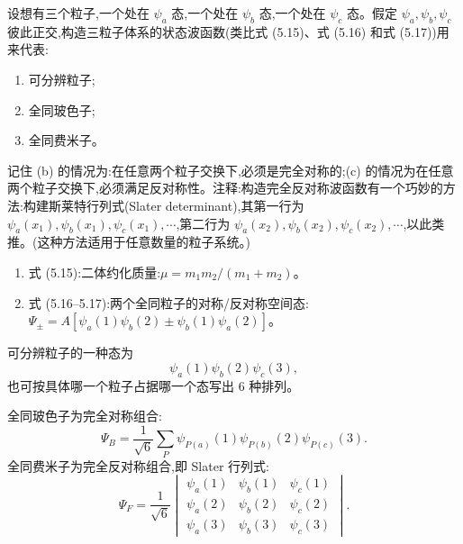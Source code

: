 \begin{question}
设想有三个粒子,一个处在 $\psi_a$ 态,一个处在 $\psi_b$ 态,一个处在 $\psi_c$ 态。假定 $\psi_a,\psi_b,\psi_c$ 彼此正交,构造三粒子体系的状态波函数(类比式 (5.15)、式 (5.16) 和式 (5.17))用来代表:
\begin{enumerate}
\item 可分辨粒子;
\item 全同玻色子;
\item 全同费米子。
\end{enumerate}
记住 (b) 的情况为:在任意两个粒子交换下,必须是完全对称的;(c) 的情况为在任意两个粒子交换下,必须满足反对称性。注释:构造完全反对称波函数有一个巧妙的方法:构建斯莱特行列式(Slater determinant),其第一行为 $\psi_a(x_1),\psi_b(x_1),\psi_c(x_1),\cdots$,第二行为 $\psi_a(x_2),\psi_b(x_2),\psi_c(x_2),\cdots$,以此类推。(这种方法适用于任意数量的粒子系统。)

\par\smallskip
{}
\begin{enumerate}[leftmargin=2.2em,itemsep=0.12em,topsep=0.12em,parsep=0pt]
\item 式 (5.15):二体约化质量:$\mu=m_1m_2/(m_1+m_2)$。
\item 式 (5.16--5.17):两个全同粒子的对称/反对称空间态:$\Psi_\pm=A[\psi_a(1)\psi_b(2)\pm\psi_b(1)\psi_a(2)]$。
\end{enumerate}

\begin{solution}

可分辨粒子的一种态为
\[
\psi_a(1)\psi_b(2)\psi_c(3),
\]
也可按具体哪一个粒子占据哪一个态写出 6 种排列。

全同玻色子为完全对称组合:
\[
\Psi_B=\frac1{\sqrt6}\sum_{P}\psi_{P(a)}(1)\psi_{P(b)}(2)\psi_{P(c)}(3).
\]
全同费米子为完全反对称组合,即 Slater 行列式:
\[
\Psi_F=\frac1{\sqrt{6}}
\begin{vmatrix}
\psi_a(1)&\psi_b(1)&\psi_c(1)\\
\psi_a(2)&\psi_b(2)&\psi_c(2)\\
\psi_a(3)&\psi_b(3)&\psi_c(3)
\end{vmatrix}.
\]

\end{solution}
\end{question}


